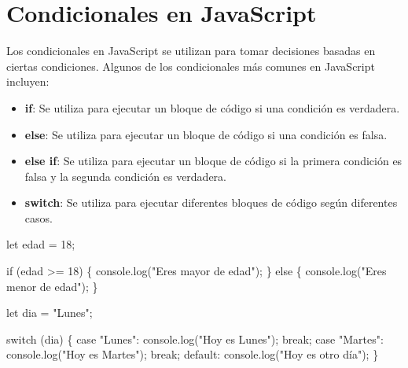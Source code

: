 \documentclass[
  a4paper,
  DIV=11,
  numbers=noendperiod,
  onepage,
  openany]{scrreprt}
\newenvironment{Shaded}{\begin{snugshade}}{\end{snugshade}}
\newcommand{\BuiltInTok}[1]{\textcolor[rgb]{0.00,0.23,0.31}{#1}}
\newcommand{\ControlFlowTok}[1]{\textcolor[rgb]{0.00,0.23,0.31}{#1}}
\newcommand{\DecValTok}[1]{\textcolor[rgb]{0.68,0.00,0.00}{#1}}
\newcommand{\FunctionTok}[1]{\textcolor[rgb]{0.28,0.35,0.67}{#1}}
\newcommand{\KeywordTok}[1]{\textcolor[rgb]{0.00,0.23,0.31}{#1}}
\newcommand{\NormalTok}[1]{\textcolor[rgb]{0.00,0.23,0.31}{#1}}
\newcommand{\OperatorTok}[1]{\textcolor[rgb]{0.37,0.37,0.37}{#1}}
\newcommand{\StringTok}[1]{\textcolor[rgb]{0.13,0.47,0.30}{#1}}
\providecommand{\tightlist}{%
  \setlength{\itemsep}{0pt}\setlength{\parskip}{0pt}}\usepackage{longtable,booktabs,array}
\begin{document}
\section{Condicionales en JavaScript}\label{condicionales-en-javascript}

Los condicionales en JavaScript se utilizan para tomar decisiones
basadas en ciertas condiciones. Algunos de los condicionales más comunes
en JavaScript incluyen:

\begin{itemize}
\tightlist
\item
  \textbf{if}: Se utiliza para ejecutar un bloque de código si una
  condición es verdadera.
\item
  \textbf{else}: Se utiliza para ejecutar un bloque de código si una
  condición es falsa.
\item
  \textbf{else if}: Se utiliza para ejecutar un bloque de código si la
  primera condición es falsa y la segunda condición es verdadera.
\item
  \textbf{switch}: Se utiliza para ejecutar diferentes bloques de código
  según diferentes casos.
\end{itemize}

\begin{Shaded}
\begin{Highlighting}[]
\KeywordTok{let}\NormalTok{ edad }\OperatorTok{=} \DecValTok{18}\OperatorTok{;}

\ControlFlowTok{if}\NormalTok{ (edad }\OperatorTok{\textgreater{}=} \DecValTok{18}\NormalTok{) \{}
    \BuiltInTok{console}\OperatorTok{.}\FunctionTok{log}\NormalTok{(}\StringTok{"Eres mayor de edad"}\NormalTok{)}\OperatorTok{;}
\NormalTok{\} }\ControlFlowTok{else}\NormalTok{ \{}
    \BuiltInTok{console}\OperatorTok{.}\FunctionTok{log}\NormalTok{(}\StringTok{"Eres menor de edad"}\NormalTok{)}\OperatorTok{;}
\NormalTok{\}}

\KeywordTok{let}\NormalTok{ dia }\OperatorTok{=} \StringTok{"Lunes"}\OperatorTok{;}

\ControlFlowTok{switch}\NormalTok{ (dia) \{}
    \ControlFlowTok{case} \StringTok{"Lunes"}\OperatorTok{:}
        \BuiltInTok{console}\OperatorTok{.}\FunctionTok{log}\NormalTok{(}\StringTok{"Hoy es Lunes"}\NormalTok{)}\OperatorTok{;}
        \ControlFlowTok{break}\OperatorTok{;}
    \ControlFlowTok{case} \StringTok{"Martes"}\OperatorTok{:}
        \BuiltInTok{console}\OperatorTok{.}\FunctionTok{log}\NormalTok{(}\StringTok{"Hoy es Martes"}\NormalTok{)}\OperatorTok{;}
        \ControlFlowTok{break}\OperatorTok{;}
    \ControlFlowTok{default}\OperatorTok{:}
        \BuiltInTok{console}\OperatorTok{.}\FunctionTok{log}\NormalTok{(}\StringTok{"Hoy es otro día"}\NormalTok{)}\OperatorTok{;}
\NormalTok{\}}
\end{Highlighting}
\end{Shaded}
\end{document}
